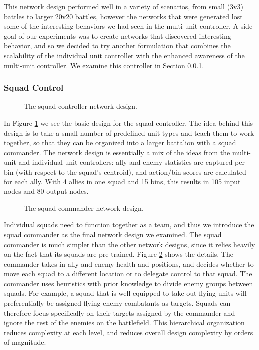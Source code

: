 \documentclass[10pt,a4paper,twocolumn]{article}
\begin{document}
This network design performed well in a variety of scenarios, from small (3v3) battles to larger 20v20 battles, however the networks that were generated lost some of the interesting behaviors we had seen in the multi-unit controller. A side goal of our experiments was to create networks that discovered interesting behavior, and so we decided to try another formulation that combines the scalability of the individual unit controller with the enhanced awareness of the multi-unit controller. We examine this controller in Section \ref{sec:squad_design}.

\subsubsection{Squad Control}
\label{sec:squad_design}

\begin{figure}

\caption{The squad controller network design.}
\label{fig:squad_design}
\end{figure}

In Figure \ref{fig:squad_design} we see the basic design for the squad controller. The idea behind this design is to take a small number of predefined unit types and teach them to work together, so that they can be organized into a larger battalion with a squad commander. The network design is essentially a mix of the ideas from the multi-unit and individual-unit controllers: ally and enemy statistics are captured per bin (with respect to the squad's centroid), and action/bin scores are calculated for each ally. With 4 allies in one squad and 15 bins, this results in 105 input nodes and 80 output nodes.

\begin{figure}

\caption{The squad commander network design.}
\label{fig:quad_commander_design}
\end{figure}

Individual squads need to function together as a team, and thus we introduce the squad commander as the final network design we examined. The squad commander is much simpler than the other network designs, since it relies heavily on the fact that its squads are pre-trained. Figure \ref{fig:quad_commander_design} shows the details. The commander takes in ally and enemy health and positions, and decides whether to move each squad to a different location or to delegate control to that squad. The commander uses heuristics with prior knowledge to divide enemy groups between squads. For example, a squad that is well-equipped to take out flying units will preferentially be assigned flying enemy combatants as targets. Squads can therefore focus specifically on their targets assigned by the commander and ignore the rest of the enemies on the battlefield. This hierarchical organization reduces complexity at each level, and reduces overall design complexity by orders of magnitude.
\end{document}
